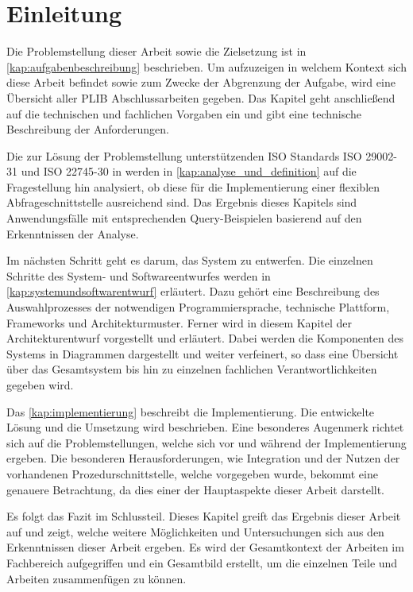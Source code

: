 
\chapter{Einleitung}\label{sec:einleitung}

Die Problemstellung dieser Arbeit sowie die Zielsetzung ist in \autoref{kap:aufgabenbeschreibung} beschrieben. Um aufzuzeigen in welchem Kontext sich diese Arbeit befindet sowie zum Zwecke der Abgrenzung der Aufgabe, wird eine Übersicht aller PLIB Abschlussarbeiten gegeben. Das Kapitel geht anschließend auf die technischen und fachlichen Vorgaben ein und gibt eine technische Beschreibung der Anforderungen.

Die zur Lösung der Problemstellung unterstützenden ISO Standards ISO 29002-31 und ISO 22745-30 in werden in \autoref{kap:analyse_und_definition} auf die Fragestellung hin analysiert, ob diese für die Implementierung einer flexiblen \gls{Abfrageschnittstelle} ausreichend sind. Das Ergebnis dieses Kapitels sind Anwendungsfälle mit entsprechenden Query-Beispielen basierend auf den Erkenntnissen der Analyse.  

Im nächsten Schritt geht es darum, das System zu entwerfen. Die einzelnen Schritte des System- und Softwareentwurfes werden in \autoref{kap:systemundsoftwarentwurf} erläutert. Dazu gehört eine Beschreibung des Auswahlprozesses der notwendigen Programmiersprache, technische Plattform, Frameworks und Architekturmuster. 
Ferner wird in diesem Kapitel der Architekturentwurf vorgestellt und erläutert. Dabei werden die Komponenten des Systems in Diagrammen dargestellt und weiter verfeinert, so dass eine Übersicht über das Gesamtsystem bis hin zu einzelnen fachlichen Verantwortlichkeiten gegeben wird. 

Das \autoref{kap:implementierung} beschreibt die Implementierung. Die entwickelte Lösung und die Umsetzung wird beschrieben. Eine besonderes Augenmerk richtet sich auf die Problemstellungen, welche sich vor und während der Implementierung ergeben. Die besonderen Herausforderungen, wie Integration und der Nutzen der vorhandenen Prozedurschnittstelle, welche vorgegeben wurde, bekommt eine genauere Betrachtung, da dies einer der Hauptaspekte dieser Arbeit darstellt.

Es folgt das Fazit im Schlussteil. Dieses Kapitel greift das Ergebnis dieser Arbeit auf und zeigt, welche weitere Möglichkeiten und Untersuchungen sich aus den Erkenntnissen dieser Arbeit ergeben. Es wird der Gesamtkontext der Arbeiten im Fachbereich aufgegriffen und ein Gesamtbild erstellt, um die einzelnen Teile und Arbeiten zusammenfügen zu können. 
